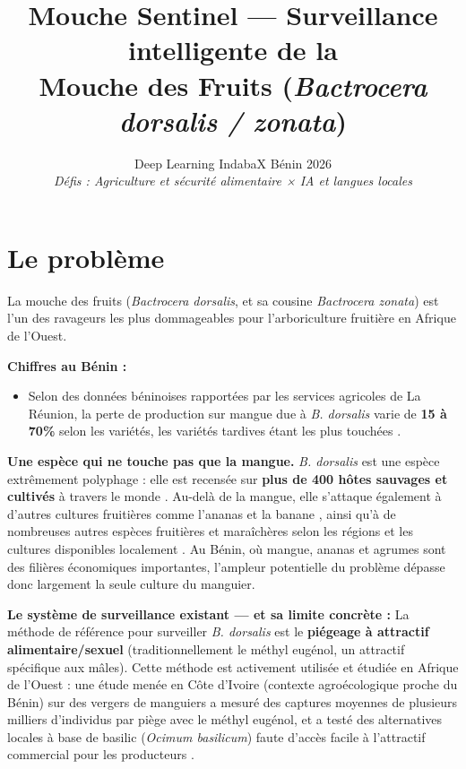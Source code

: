 \documentclass[11pt,a4paper]{article}
\title{Mouche Sentinel — Surveillance intelligente de la\\ Mouche des Fruits (\textit{Bactrocera dorsalis / zonata})}
\author{Deep Learning IndabaX Bénin 2026\\ \textit{Défis : Agriculture et sécurité alimentaire × IA et langues locales}}
\date{}
\begin{document}
\maketitle

\section{Le problème}

La mouche des fruits (\textit{Bactrocera dorsalis}, et sa cousine \textit{Bactrocera zonata}) est l'un des ravageurs les plus dommageables pour l'arboriculture fruitière en Afrique de l'Ouest.

\textbf{Chiffres au Bénin :}
\begin{itemize}
    \item Selon des données béninoises rapportées par les services agricoles de La Réunion, la perte de production sur mangue due à \textit{B. dorsalis} varie de \textbf{15 à 70\%} selon les variétés, les variétés tardives étant les plus touchées \cite{daaf}.
\end{itemize}

\textbf{Une espèce qui ne touche pas que la mangue.} \textit{B. dorsalis} est une espèce extrêmement polyphage : elle est recensée sur \textbf{plus de 400 hôtes sauvages et cultivés} à travers le monde \cite{jardinsdefrance}. Au-delà de la mangue, elle s'attaque également à d'autres cultures fruitières comme l'ananas et la banane \cite{departement974}, ainsi qu'à de nombreuses autres espèces fruitières et maraîchères selon les régions et les cultures disponibles localement \cite{jardinsdefrance}. Au Bénin, où mangue, ananas et agrumes sont des filières économiques importantes, l'ampleur potentielle du problème dépasse donc largement la seule culture du manguier.

\textbf{Le système de surveillance existant — et sa limite concrète :}
La méthode de référence pour surveiller \textit{B. dorsalis} est le \textbf{piégeage à attractif alimentaire/sexuel} (traditionnellement le méthyl eugénol, un attractif spécifique aux mâles). Cette méthode est activement utilisée et étudiée en Afrique de l'Ouest : une étude menée en Côte d'Ivoire (contexte agroécologique proche du Bénin) sur des vergers de manguiers a mesuré des captures moyennes de plusieurs milliers d'individus par piège avec le méthyl eugénol, et a testé des alternatives locales à base de basilic (\textit{Ocimum basilicum}) faute d'accès facile à l'attractif commercial pour les producteurs \cite{cotedivoire}.
\end{document}

